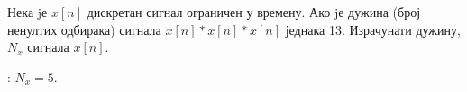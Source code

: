 \PID
Нека jе $x[n]$ дискретан сигнал ограничен у времену. Ако jе дужина (број ненултих одбирака)
сигнала $x[n] \ast x[n] \ast x[n]$ једнака 13. Израчунати дужину, $N_x$ сигнала $x[n]$. 
\vspace*{2mm}

: $N_x = 5$.